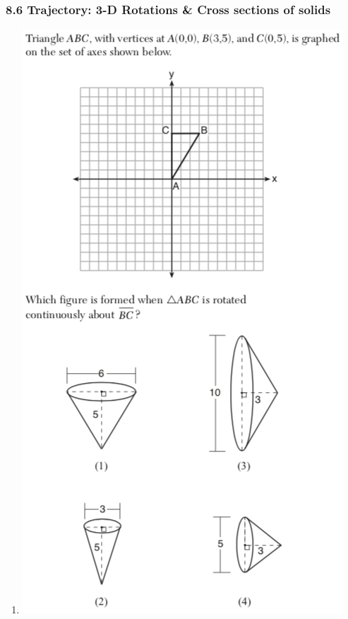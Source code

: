 \documentclass[12pt, twoside]{article}
\begin{document}
\subsubsection*{8.6 Trajectory: 3-D Rotations \& Cross sections of solids} %
 \begin{enumerate}

  \item %
    \includegraphics[scale=0.75]{triangle_3d_rotation_JN2018.png}

\newpage


\end{enumerate}
\end{document}
